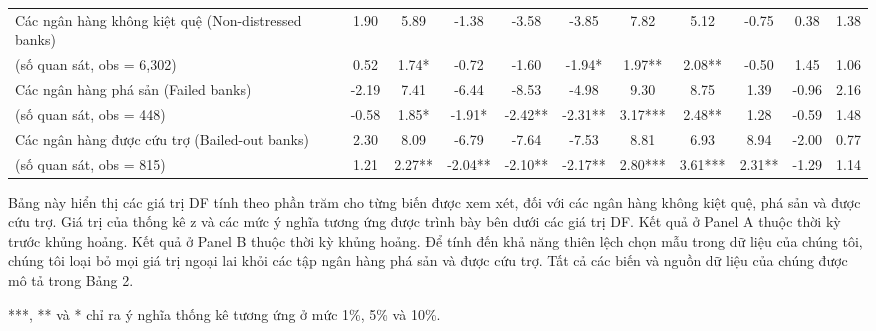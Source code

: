 \begin{landscape}
\begin{center}
{\begin{adjustbox}{max width=\textheight}
\begin{tabular}{lcccccccccc}
Các ngân hàng không kiệt quệ (Non-distressed banks) & 1.90 & 5.89 & -1.38 & -3.58 & -3.85 & 7.82 & 5.12 & -0.75 & 0.38 & 1.38 \\
(số quan sát, obs = 6,302) & 0.52 & 1.74* & -0.72 & -1.60 & -1.94* & 1.97** & 2.08** & -0.50 & 1.45 & 1.06 \\
Các ngân hàng phá sản (Failed banks) & -2.19 & 7.41 & -6.44 & -8.53 & -4.98 & 9.30 & 8.75 & 1.39 & -0.96 & 2.16 \\
(số quan sát, obs = 448) & -0.58 & 1.85* & -1.91* & -2.42** & -2.31** & 3.17*** & 2.48** & 1.28 & -0.59 & 1.48 \\
Các ngân hàng được cứu trợ (Bailed-out banks) & 2.30 & 8.09 & -6.79 & -7.64 & -7.53 & 8.81 & 6.93 & 8.94 & -2.00 & 0.77 \\
(số quan sát, obs = 815) & 1.21 & 2.27** & -2.04** & -2.10** & -2.17** & 2.80*** & 3.61*** & 2.31** & -1.29 & 1.14 \\
\bottomrule
\end{tabular}
\end{adjustbox}}
\end{center}
\end{landscape}

Bảng này hiển thị các giá trị DF tính theo phần trăm cho từng biến được xem xét, đối với các ngân hàng không kiệt quệ, phá sản và được cứu trợ. Giá trị của thống kê z và các mức ý nghĩa tương ứng được trình bày bên dưới các giá trị DF. Kết quả ở Panel A thuộc thời kỳ trước khủng hoảng. Kết quả ở Panel B thuộc thời kỳ khủng hoảng. Để tính đến khả năng thiên lệch chọn mẫu trong dữ liệu của chúng tôi, chúng tôi loại bỏ mọi giá trị ngoại lai khỏi các tập ngân hàng phá sản và được cứu trợ. Tất cả các biến và nguồn dữ liệu của chúng được mô tả trong Bảng 2.

***, ** và * chỉ ra ý nghĩa thống kê tương ứng ở mức 1\%, 5\% và 10\%.
